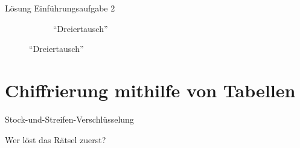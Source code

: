\begin{frame}[label=intro2Sol]{Lösung Einführungsaufgabe 2}
\begin{figure}[H]
\begin{subfigure}[b]{0.45\textwidth}
            \caption{\enquote{Dreiertausch}}
        \end{subfigure}
    \end{figure}
\end{frame}


\section{Chiffrierung mithilfe von Tabellen}

\begin{frame}{Stock-und-Streifen-Verschlüsselung}
    \begin{center}
        \large {} Wer löst das Rätsel zuerst?
    \end{center}
\end{frame}

